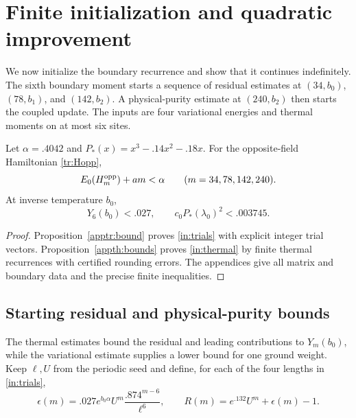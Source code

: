 \section{Finite initialization and quadratic improvement}\label{sec:initialization}
We now initialize the boundary recurrence and show that it continues
indefinitely. The sixth boundary moment starts a sequence of residual
estimates at $(34,b_0)$, $(78,b_1)$, and $(142,b_2)$. A physical-purity
estimate at $(240,b_2)$ then starts the coupled update. The inputs are
four variational energies and thermal moments on at most six sites.

\begin{proposition}\label{in:finite}
Let $\alpha=.4042$ and $P_*(x)=x^3-.14x^2-.18x$. For the
opposite-field Hamiltonian \eqref{tr:Hopp},
\begin{equation}\label{in:trials}
 E_0(H_m^{\rm opp})+am<\alpha\qquad(m=34,78,142,240).
\end{equation}
At inverse temperature $b_0$,
\begin{equation}\label{in:thermal}
 Y_6(b_0)<.027,\qquad c_0P_*(\lambda_0)^2<.003745.
\end{equation}
\end{proposition}
\begin{proof}
Proposition~\ref{apptr:bound} proves \eqref{in:trials} with explicit
integer trial vectors. Proposition~\ref{appth:bounds} proves
\eqref{in:thermal} by finite thermal recurrences with certified
rounding errors. The appendices give all matrix and boundary data and
the precise finite inequalities.
\end{proof}

\subsection{Starting residual and physical-purity bounds}
The thermal estimates bound the residual and leading contributions to
$Y_m(b_0)$, while the variational estimate supplies a lower bound for
one ground weight.
Keep $\ell,U$ from the periodic seed and define, for each of the four
lengths in \eqref{in:trials},
\begin{equation}\label{in:epsR}
 \epsilon(m)=.027e^{b_0\alpha}U^m\frac{.874^{m-6}}{\ell^6},
 \qquad R(m)=e^{.132}U^m+\epsilon(m)-1.
\end{equation}

